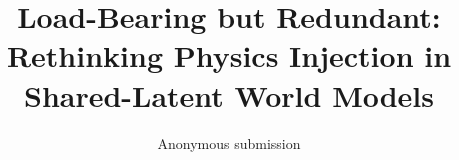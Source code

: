 \documentclass[letterpaper]{article} %
\title{Load-Bearing but Redundant:\\ Rethinking Physics Injection in Shared-Latent World Models}
\author{Anonymous submission}
\newif\ifappendixinline\appendixinlinetrue
\begin{document}
\maketitle

\begin{abstract}

\end{abstract}









\ifappendixinline
  \clearpage
  \appendix
  
\fi
\end{document}
